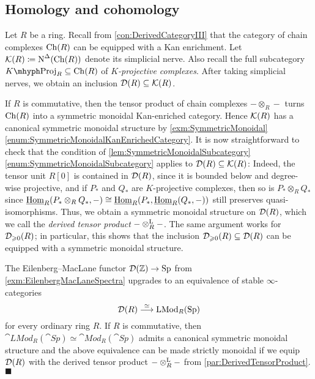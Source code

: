 \subsection{Homology and cohomology}\label{subsec:Homology}
\begin{numpar}\label{par:DerivedTensorProduct}
	Let $R$ be a ring. Recall from \cref{con:DerivedCategoryIII} that the category of chain complexes $\operatorname{Ch}(R)$ can be equipped with a Kan enrichment. Let $\mathcal{K}(R)\coloneqq \operatorname{N}^\Delta(\operatorname{Ch}(R))$ denote its simplicial nerve. Also recall the full subcategory $K\mhyph\cat{Proj}_R\subseteq \Ch(R)$ of \emph{$K$-projective complexes}. After taking simplicial nerves, we obtain an inclusion $\mathcal{D}(R)\subseteq \mathcal{K}(R)$.
	
	If $R$ is commutative, then the tensor product of chain complexes $-\otimes_R-$ turns $\operatorname{Ch}(R)$ into a symmetric monoidal Kan-enriched category. Hence $\mathcal{K}(R)$ has a canonical symmetric monoidal structure by \cref{exm:SymmetricMonoidal}\cref{enum:SymmetricMonoidalKanEnrichedCategory}. It is now straightforward to check that the condition of \cref{lem:SymmetricMonoidalSubcategory}\cref{enum:SymmetricMonoidalSubcategory} applies to $\mathcal{D}(R)\subseteq \mathcal{K}(R)$: Indeed, the tensor unit $R[0]$ is contained in $\mathcal{D}(R)$, since it is bounded below and degree-wise projective, and if $P_*$ and $Q_*$ are $K$-projective complexes, then so is $P_*\otimes_RQ_*$ since $\operatorname{\underline{Hom}}_{R}(P_*\otimes_RQ_*,-)\cong \operatorname{\underline{Hom}}_{R}(P_*,\operatorname{\underline{Hom}}_R(Q_*,-))$ still preserves quasi-isomorphisms. Thus, we obtain a symmetric monoidal structure on $\mathcal{D}(R)$, which we call the \emph{derived tensor product} $-\otimes_R^{\mathrm{L}}-$. The same argument works for $\mathcal{D}_{\geqslant 0}(R)$; in particular, this shows that the inclusion $\mathcal{D}_{\geqslant 0}(R)\subseteq \mathcal{D}(R)$ can be equipped with a symmetric monoidal structure.
\end{numpar}
\begin{thm}\label{thm:DRIsModulesOverHR}
	The Eilenberg--MacLane functor $\mathcal{D}(\mathbb{Z})\rightarrow \mathrm{Sp}$ from \cref{exm:EilenbergMacLaneSpectra} upgrades to an equivalence of stable $\infty$-categories
	\begin{equation*}
		\mathcal{D}(R)\overset{\simeq}{\longrightarrow} \mathrm{LMod}_{R}(\mathrm{Sp})
	\end{equation*}
	for every ordinary ring $R$. If $R$ is commutative, then $\cat{LMod}_{R}(\cat{Sp})\simeq \cat{Mod}_R(\cat{Sp})$ admits a canonical symmetric monoidal structure and the above equivalence can be made strictly monoidal if we equip $\mathcal{D}(R)$ with the derived tensor product $-\otimes^{\mathrm{L}}_R-$ from \cref{par:DerivedTensorProduct}.\hfill$\blacksquare$
\end{thm}
